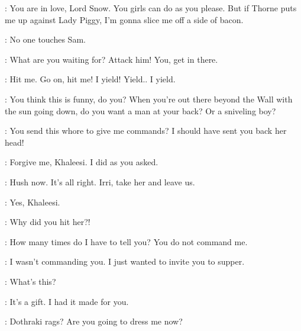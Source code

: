 \RAST: You are in love, Lord Snow. You girls can do as you please. But if Thorne puts me up against Lady Piggy, I'm gonna slice me off a side of bacon. 

\scene


\JON: No one touches Sam. 

\scene


\ALLISER: What are you waiting for?  Attack him!  You, get in there. 


\GRENN:  Hit me. Go on, hit me!   I yield! Yield.. I yield. 

\ALLISER:  You think this is funny, do you? When you're out there beyond the Wall with the sun going down, do you want a man at your back? Or a sniveling boy? 

\scene



\VISERYS: You send this whore to give me commands? I should have sent you back her head! 

\DOREAH: Forgive me, Khaleesi. I did as you asked. 

\DAENERYS: Hush now. It's all right. Irri, take her and leave us. 

\IRRI: Yes, Khaleesi. 

\DAENERYS: Why did you hit her?! 

\VISERYS: How many times do I have to tell you? You do not command me. 

\DAENERYS: I wasn't commanding you. I just wanted to invite you to supper. 

\VISERYS: What's this? 

\DAENERYS: It's a gift. I had it made for you. 

\VISERYS: Dothraki rags? Are you going to dress me now? 

